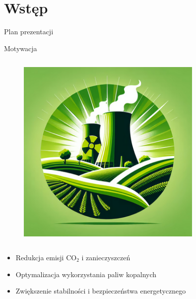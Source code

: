 \section{Wstęp}

\begin{frame}{Plan prezentacji}
    \tableofcontents
\end{frame}

\begin{columnframe}{Motywacja}
    \begin{column}{0.5\textwidth}
        \begin{figure}
            \centering
            \includegraphics[width=0.8\textwidth, frame]{images/green_nuclear_stock.png}
        \end{figure}
    \end{column}
    \begin{column}{0.5\textwidth}
        \begin{itemize}
            \item Redukcja emisji CO$_2$ i zanieczyszczeń
            \item Optymalizacja wykorzystania paliw kopalnych
            \item Zwiększenie stabilności i bezpieczeństwa energetycznego
        \end{itemize}
    \end{column}
\end{columnframe}

